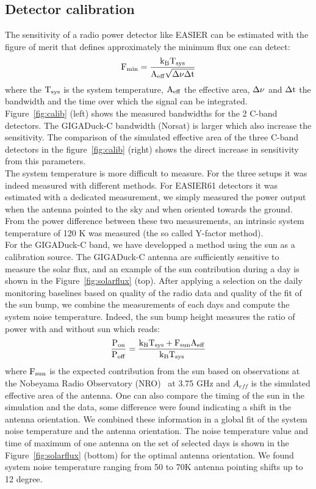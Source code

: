 \documentclass{PoS}
\begin{document}
\subsection{Detector calibration}
The sensitivity of a radio power detector like EASIER can be estimated with the figure of merit that defines approximately the minimum flux one can detect:
\begin{equation}
	\rm	F_{min} = \frac{k_{B}T_{sys}}{A_{eff}\sqrt{\Delta \nu \Delta t}}
\end{equation}
where the $\rm T_{sys}$ is the system temperature, $\rm A_{eff}$ the effective area, $\rm \Delta \nu$ and $\rm \Delta t$ the bandwidth and the time over which the signal can be integrated.\\
Figure~\ref{fig:calib} (left) shows the measured bandwidths for the 2 C-band detectors. The GIGADuck-C bandwidth (Norsat) is larger which also increase the sensitivity.  The comparison of the simulated effective area of the three C-band detectors in the figure~\ref{fig:calib} (right) shows the direct increase in sensitivity from this parameters. \\The system temperature is more difficult to measure. For the three setups it was indeed measured with different methods. For EASIER61 detectors it was estimated with a dedicated measurement, we simply measured the power output when the antenna pointed to the sky and when oriented towards the ground. From the power difference between these two measurements, an intrinsic system temperature of 120 K was measured (the so called Y-factor method). \\ For the GIGADuck-C band, we have developped a method using the sun as a calibration source. The GIGADuck-C antenna are sufficiently  sensitive to measure the solar flux, and an example of the sun contribution during a day is shown in the Figure~\ref{fig:solarflux} (top). After applying a selection on the daily monitoring baselines based on quality of the radio data and quality of the fit of the sun bump, we combine the measurements of each days and compute the system noise temperature. Indeed, the sun bump height measures the ratio of power with and without sun which reads:
\begin{equation}
	\rm	\frac{P_{on}}{P_{off}} = \frac{k_{B}T_{sys} + F_{sun}A_{eff}}{k_{B}T_{sys}}
\end{equation}
where $\rm F_{sun} $ is the expected contribution from the sun   based on observations at the Nobeyama Radio Observatory (NRO)~\cite{bib:nobeyama} at 3.75 GHz and $A_{eff}$ is the simulated effective area of the antenna. One can also compare the timing of the sun in the simulation and the data, some difference were found indicating a shift in the antenna orientation. We combined these information in a global fit of the system noise temperature and the antenna orientation. The noise temperature value and time of maximum of one antenna on the set of selected days is shown in the Figure~\ref{fig:solarflux} (bottom) for the optimal antenna orientation. We found system noise temperature ranging from 50 to 70K antenna pointing shifts up to 12 degree. 
\end{document}
